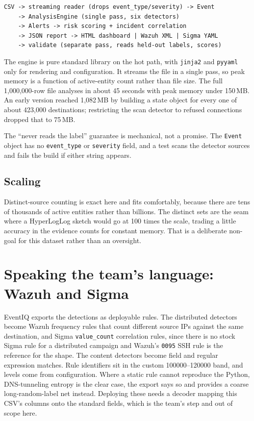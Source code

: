 \documentclass[11pt,a4paper]{article}
\newcommand{\code}[1]{\texttt{#1}}
\begin{document}
\begin{lstlisting}
CSV -> streaming reader (drops event_type/severity) -> Event
    -> AnalysisEngine (single pass, six detectors)
    -> Alerts -> risk scoring + incident correlation
    -> JSON report -> HTML dashboard | Wazuh XML | Sigma YAML
    -> validate (separate pass, reads held-out labels, scores)
\end{lstlisting}

The engine is pure standard library on the hot path, with \code{jinja2} and
\code{pyyaml} only for rendering and configuration. It streams the file in a
single pass, so peak memory is a function of active-entity count rather than file
size. The full 1,000,000-row file analyses in about 45 seconds with peak memory
under 150\,MB. An early version reached 1,082\,MB by building a state object for
every one of about 423,000 destinations; restricting the scan detector to refused
connections dropped that to 75\,MB.

The ``never reads the label'' guarantee is mechanical, not a promise. The
\code{Event} object has no \code{event\_type} or \code{severity} field, and a
test scans the detector sources and fails the build if either string appears.

\subsection{Scaling}

Distinct-source counting is exact here and fits comfortably, because there are
tens of thousands of active entities rather than billions. The distinct sets are
the seam where a HyperLogLog sketch would go at 100 times the scale, trading a
little accuracy in the evidence counts for constant memory. That is a deliberate
non-goal for this dataset rather than an oversight.

\section{Speaking the team's language: Wazuh and Sigma}

EventIQ exports the detections as deployable rules. The distributed detectors
become Wazuh frequency rules that count different source IPs against the same
destination, and Sigma \code{value\_count} correlation rules, since there is no
stock Sigma rule for a distributed campaign and Wazuh's \code{0095} SSH rule is
the reference for the shape. The content detectors become field and regular
expression matches. Rule identifiers sit in the custom 100000--120000 band, and
levels come from configuration. Where a static rule cannot reproduce the Python,
DNS-tunneling entropy is the clear case, the export says so and provides a coarse
long-random-label net instead. Deploying these needs a decoder mapping this CSV's
columns onto the standard fields, which is the team's step and out of scope here.
\end{document}
